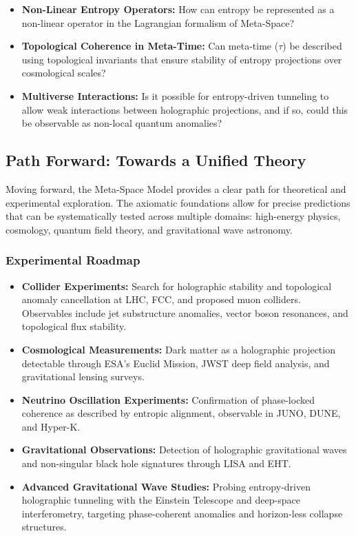 \documentclass[10.5pt,a4paper]{article}
\begin{document}
\begin{itemize}
    \item \textbf{Non-Linear Entropy Operators:} How can entropy be represented as a non-linear operator in the Lagrangian formalism of Meta-Space?

    \item \textbf{Topological Coherence in Meta-Time:} Can meta-time (\( \tau \)) be described using topological invariants that ensure stability of entropy projections over cosmological scales?

    \item \textbf{Multiverse Interactions:} Is it possible for entropy-driven tunneling to allow weak interactions between holographic projections, and if so, could this be observable as non-local quantum anomalies?
\end{itemize}

\subsection{Path Forward: Towards a Unified Theory}

Moving forward, the Meta-Space Model provides a clear path for theoretical and experimental exploration. The axiomatic foundations allow for precise predictions that can be systematically tested across multiple domains: high-energy physics, cosmology, quantum field theory, and gravitational wave astronomy.

\subsubsection{Experimental Roadmap}

\begin{itemize}
    \item \textbf{Collider Experiments:} Search for holographic stability and topological anomaly cancellation at LHC, FCC, and proposed muon colliders. Observables include jet substructure anomalies, vector boson resonances, and topological flux stability.

    \item \textbf{Cosmological Measurements:} Dark matter as a holographic projection detectable through ESA's Euclid Mission, JWST deep field analysis, and gravitational lensing surveys.

    \item \textbf{Neutrino Oscillation Experiments:} Confirmation of phase-locked coherence as described by entropic alignment, observable in JUNO, DUNE, and Hyper-K.

    \item \textbf{Gravitational Observations:} Detection of holographic gravitational waves and non-singular black hole signatures through LISA and EHT.

    \item \textbf{Advanced Gravitational Wave Studies:} Probing entropy-driven holographic tunneling with the Einstein Telescope and deep-space interferometry, targeting phase-coherent anomalies and horizon-less collapse structures.
\end{itemize}
\end{document}
